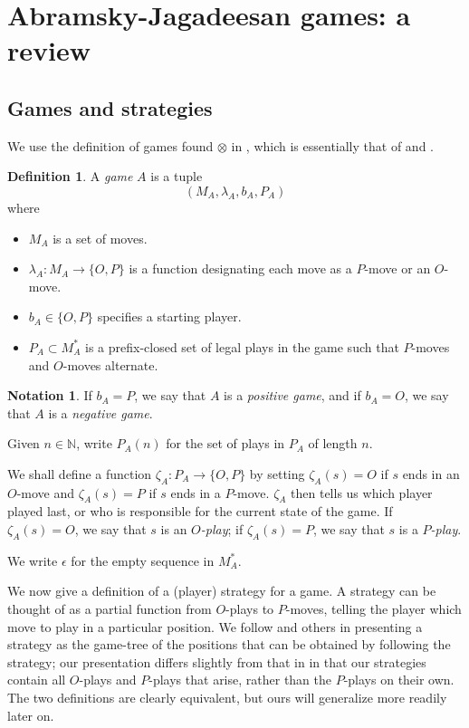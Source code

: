 \documentclass[11pt]{article} %
\theoremstyle{plain} %
\theoremstyle{definition} %
\newtheorem{definition}[theorem]{Definition}
\newtheorem{notation}[theorem]{Notation}
\theoremstyle{exercisestyle}
\newcommand*\from{\colon}
\newcommand{\cmap}[3]{#1\from{}#2\to{}#3}
\begin{document}
\section{Abramsky-Jagadeesan games: a review}
\label{abjagreview}

\subsection{Games and strategies}

We use the definition of games found $\otimes$ in \cite{martinsthesis}, which is essentially that of \cite{blassgames} and \cite{abramskyjagadeesangames}.  

\begin{definition}
  A \emph{game} $A$ is a tuple
  \[
    (M_A, \lambda_A, b_A, P_A)
  \]
  where
  \begin{itemize}
    \item $M_A$ is a set of moves.
    \item $\cmap{\lambda_A}{M_A}{\{O,P\}}$ is a function designating each move as a $P$-move or an $O$-move.
    \item $b_A\in\{O,P\}$ specifies a starting player.
    \item $P_A\subset M_A^*$ is a prefix-closed set of legal plays in the game such that $P$-moves and $O$-moves alternate.
  \end{itemize}
\end{definition}

\begin{notation}
  If $b_A=P$, we say that $A$ is a \emph{positive game}, and if $b_A=O$, we say that $A$ is a \emph{negative game}.

  Given $n\in\mathbb N$, write $P_A(n)$ for the set of plays in $P_A$ of length $n$.  

  We shall define a function $\cmap{\zeta_A}{P_A}{\{O,P\}}$ by setting $\zeta_A(s)=O$ if $s$ ends in an $O$-move and $\zeta_A(s)=P$ if $s$ ends in a $P$-move.   $\zeta_A$ then tells us which player played last, or who is responsible for the current state of the game.  If $\zeta_A(s)=O$, we say that $s$ is an \emph{$O$-play}; if $\zeta_A(s)=P$, we say that $s$ is a \emph{$P$-play}.  

  We write $\epsilon$ for the empty sequence in $M_A^*$.
\end{notation}

We now give a definition of a (player) strategy for a game.  A strategy can be thought of as a partial function from $O$-plays to $P$-moves, telling the player which move to play in a particular position.  We follow \cite{martinsthesis} and others in presenting a strategy as the game-tree of the positions that can be obtained by following the strategy; our presentation differs slightly from that in \cite{martinsthesis} in that our strategies contain all $O$-plays and $P$-plays that arise, rather than the $P$-plays on their own.  The two definitions are clearly equivalent, but ours will generalize more readily later on.
\end{document}
